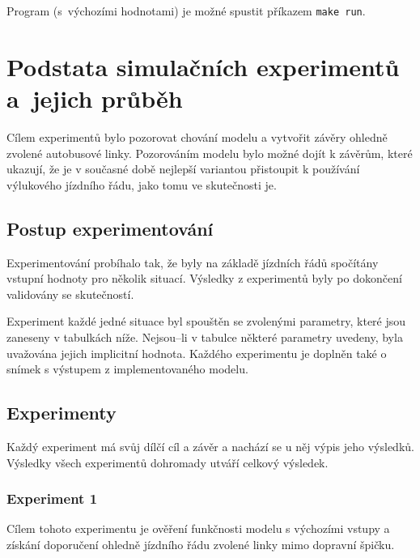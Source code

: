 \documentclass[a4paper]{article}
\begin{document}
            Program (s~výchozími hodnotami) je možné spustit příkazem \texttt{make run}.

    \section{Podstata simulačních experimentů a~jejich průběh}
    \label{sec:simulation}

        Cílem experimentů bylo pozorovat chování modelu a vytvořit závěry ohledně zvolené autobusové linky. Pozorováním modelu bylo možné dojít k závěrům, které ukazují, že je v současné době nejlepší variantou přistoupit k používání výlukového jízdního řádu, jako tomu ve skutečnosti je.
        \subsection{Postup experimentování}
        \label{subsec:experiments_methods}
			Experimentování probíhalo tak, že byly na základě jízdních řádů spočítány vstupní hodnoty pro několik situací. Výsledky z experimentů byly po dokončení validovány se skutečností.

            Experiment každé jedné situace byl spouštěn se zvolenými parametry, které jsou zaneseny v tabulkách níže. Nejsou--li v tabulce některé parametry uvedeny, byla uvažována jejich implicitní hodnota. Každého experimentu je doplněn také o snímek s výstupem z implementovaného modelu.
        \subsection{Experimenty}
        \label{subsec:experiments}

            Každý experiment má svůj dílčí cíl a závěr a nachází se u něj výpis jeho výsledků. Výsledky všech experimentů dohromady utváří celkový výsledek.
			\newpage
            \subsubsection{Experiment 1}
            \label{subsubsec:experiment1}

                Cílem tohoto experimentu je ověření funkčnosti modelu s výchozími vstupy a získání doporučení ohledně jízdního řádu zvolené linky mimo dopravní špičku.
\end{document}
